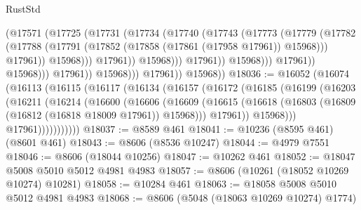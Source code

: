 \begin{lexlean}{RustStd}
\begin{coremodule}
                                          (@17571
                                            (@17725
                                              (@17731
                                                (@17734
                                                  (@17740
                                                    (@17743
                                                      (@17773
                                                        (@17779
                                                          (@17782
                                                            (@17788
                                                              (@17791
                                                                (@17852
                                                                  (@17858
                                                                    (@17861 (@17958 @17961))
                                                                    @15968)))
                                                              @17961))
                                                          @15968)))
                                                    @17961))
                                                @15968)))
                                          @17961))
                                      @15968)))
                                @17961))
                            @15968)))
                      @17961))
                  @15968)))
            @17961))
        @15968))
@18036 := @16052
    (@16074
      (@16113
        (@16115
          (@16117
            (@16134
              (@16157
                (@16172
                  (@16185
                    (@16199
                      (@16203
                        (@16211
                          (@16214
                            (@16600
                              (@16606
                                (@16609
                                  (@16615
                                    (@16618
                                      (@16803 (@16809 (@16812 (@16818 @18009 @17961)) @15968)))
                                    @17961))
                                @15968)))
                          @17961)))))))))))
@18037 := @8589 @461
@18041 := @10236 (@8595 @461) (@8601 @461)
@18043 := @8606 (@8536 @10247)
@18044 := @4979 @7551
@18046 := @8606 (@18044 @10256)
@18047 := @10262 @461
@18052 := @18047 @5008 @5010 @5012 @4981 @4983
@18057 := @8606 (@10261 (@18052 @10269 @10274) @10281)
@18058 := @10284 @461
@18063 := @18058 @5008 @5010 @5012 @4981 @4983
@18068 := @8606 (@5048 (@18063 @10269 @10274) @1774)

\end{coremodule}
\end{lexlean}
